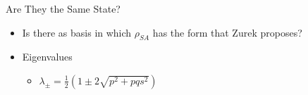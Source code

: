 \documentclass{beamer}
\begin{document}
\begin{frame}{Are They the Same State?}
\begin{itemize}
    \item<1-> Is there as basis in which $\rho_{SA}$ has the form that Zurek proposes?
    \item<2-> Eigenvalues
    \begin{itemize}
        \item $\lambda_\pm = \frac{1}{2}\left(1 \pm 2\sqrt{p^2 + pqs^2}\right)$
    \end{itemize}
\end{itemize}

\end{frame}
\end{document}

